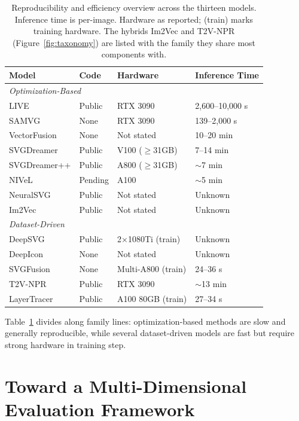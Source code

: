 \begin{table}[htbp]
\centering
\caption{Reproducibility and efficiency overview across 
the thirteen models. Inference time is per-image. 
Hardware as reported; (train) marks training hardware. The hybrids Im2Vec and T2V-NPR 
(Figure~\ref{fig:taxonomy}) are listed with the family 
they share most components with.}
\label{tab:reproducibility}
\small
\begin{tabularx}{\textwidth}{l l l l}
\toprule
\textbf{Model} & \textbf{Code} & \textbf{Hardware} & 
\textbf{Inference Time} \\
\midrule
\multicolumn{4}{l}{\textit{Optimization-Based}} \\
\midrule
LIVE         & Public   & RTX 3090        & 2,600--10,000 s \\
SAMVG        & None     & RTX 3090        & 139--2,000 s    \\
VectorFusion & None     & Not stated      & 10--20 min      \\
SVGDreamer   & Public   & V100 ($\geq$31GB)  & 7--14 min       \\
SVGDreamer++ & Public   & A800 ($\geq$31GB)  & $\sim$7 min     \\
NIVeL        & Pending  & A100            & $\sim$5 min     \\
NeuralSVG    & Public   & Not stated      & Unknown         \\
Im2Vec       & Public   & Not stated      & Unknown         \\
\midrule
\multicolumn{4}{l}{\textit{Dataset-Driven}} \\
\midrule
DeepSVG      & Public   & 2$\times$1080Ti (train) & Unknown  \\
DeepIcon     & None     & Not stated      & Unknown         \\
SVGFusion    & None     & Multi-A800 (train) & 24--36 s     \\
T2V-NPR      & Public   & RTX 3090        & $\sim$13 min    \\
LayerTracer  & Public   & A100 80GB (train) & 27--34 s      \\
\bottomrule
\end{tabularx}
\end{table}

Table~\ref{tab:reproducibility} divides 
along family lines: optimization-based methods 
are slow and generally reproducible, while several 
dataset-driven models are fast but require strong hardware in training step.


\section{Toward a Multi-Dimensional Evaluation Framework}
\label{sec:framework}

